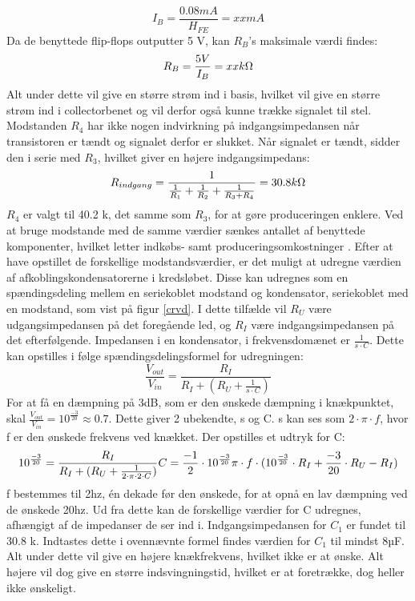 \begin{equation}
I_B = \frac{0.08 mA}{H_{FE}} = xx mA
\end{equation}
Da de benyttede flip-flops outputter 5 V, kan $R_B$'s maksimale værdi findes:
\begin{equation}
R_B = \frac{5 V}{I_B} = xx k\ohm
\end{equation}
Alt under dette vil give en større strøm ind i basis, hvilket vil give en større strøm ind i collectorbenet og vil derfor også kunne trække signalet til stel.
Modstanden $R_4$ har ikke nogen indvirkning på indgangsimpedansen når transistoren er tændt og signalet derfor er slukket. Når signalet er tændt, sidder den i serie med $R_3$, hvilket giver en højere indgangsimpedans:
\begin{equation}
R_{indgang}=\frac{1}{\frac{1}{R_1}+\frac{1}{R_2}+\frac{1}{R_3+R_4}}=30.8 k\ohm
\end{equation}
$R_4$ er valgt til 40.2 k\ohm, det samme som $R_3$, for at gøre produceringen enklere. Ved at bruge modstande med de samme værdier sænkes antallet af benyttede komponenter, hvilket letter indkøbs- samt produceringsomkostninger .
Efter at have opstillet de forskellige modstandsværdier, er det muligt at udregne værdien af afkoblingskondensatorerne i kredsløbet. Disse kan udregnes som en spændingsdeling mellem en seriekoblet modstand og kondensator, seriekoblet med en modstand, som vist på figur \ref{crvd}. I dette tilfælde vil $R_U$ være udgangsimpedansen på det foregående led, og $R_I$ være indgangsimpedansen på det efterfølgende. Impedansen i en kondensator, i frekvensdomænet er $\frac{1}{s\cdot C}$. Dette kan opstilles i følge spændingsdelingsformel for udregningen:
\begin{equation}
\frac{V_{out}}{V_{in}}=\frac{R_I}{R_I+(R_U+\frac{1}{s\cdot C})}
\end{equation}
For at få en dæmpning på 3dB, som er den ønskede dæmpning i knækpunktet, skal $\frac{V_{out}}{V_{in}}=10^{\frac{-3}{20}}\approx0.7$. 
Dette giver 2 ubekendte, s og C. s kan ses som $2\cdot \pi \cdot f$, hvor f er den ønskede frekvens ved knækket. Der opstilles et udtryk for C:
\begin{equation}
10^{\frac{-3}{20}}=\frac{R_I}{R_I+(R_U+\frac{1}{2\cdot\pi\cdot 2\cdot C})}\\
C=\frac{-1}{2}\cdot{10^{\frac{-3}{20}}}{\pi\cdot f\cdot(10^{\frac{-3}{20}}\cdot R_I+\frac{-3}{20}}\cdot R_U - R_I)
\end{equation}
f bestemmes til 2hz, én dekade før den ønskede, for at opnå en lav dæmpning ved de ønskede 20hz. Ud fra dette kan de forskellige værdier for C udregnes, afhængigt af de impedanser de ser ind i.
Indgangsimpedansen for $C_1$ er fundet til 30.8 k\ohm . Indtastes dette i ovennævnte formel findes værdien for $C_1$ til mindst 8µF. Alt under dette vil give en højere knækfrekvens, hvilket ikke er at ønske. Alt højere vil dog give en større indsvingningstid, hvilket er at foretrække, dog heller ikke ønskeligt.